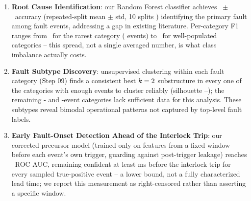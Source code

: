 \begin{enumerate}
    \item \textbf{Root Cause Identification}: our Random Forest classifier achieves \MetricZeroEightPhaseThreeaRootcauseStabilityAccuracyMean\ $\pm$ \MetricZeroEightPhaseThreeaRootcauseStabilityAccuracyStd\ accuracy (repeated-split mean $\pm$ std, 10 splits %
) identifying the primary fault among \MetricZeroEightPhaseThreeaRootcauseNFaultEvents{} fault events, addressing a gap in existing literature. Per-category F1 ranges from \MetricZeroEightPhaseThreeaRootcauseStabilityPerLabelFOneCoupureExterneRapideMean\ for the rarest category (\MetricZeroZeroDataAttritionChainGtPassingCoupureExterneRapide{} events) to \MetricZeroEightPhaseThreeaRootcauseStabilityPerLabelFOneDPSeuilDeSCuritRFMean\ for well-populated categories -- this spread, not a single averaged number, is what class imbalance actually costs.

    \item \textbf{Fault Subtype Discovery}: unsupervised clustering within each fault category (Step 09) %
finds a consistent best $k=2$ substructure in every one of the \MetricZeroNinecEnhancedSubclassDiscoveryNCategoriesAnalyzed{} categories with enough events to cluster reliably (silhouette \MetricZeroNinecEnhancedSubclassDiscoveryCavityQuenchBreakdownSilhouette--\MetricZeroNinecEnhancedSubclassDiscoveryVacuumThresholdSilhouette); the remaining \MetricZeroZeroDataAttritionChainGtPassingSeuilPickUp- and \MetricZeroZeroDataAttritionChainGtPassingCoupureExterneRapide-event categories lack sufficient data for this analysis. These subtypes reveal bimodal operational patterns not captured by top-level fault labels.

    \item \textbf{Early Fault-Onset Detection Ahead of the Interlock Trip}: our corrected precursor model (trained only on features from a fixed window before each event's own trigger, guarding against post-trigger leakage) reaches \MetricZeroFivePhaseZeroPrecursorRandomForestRocAuc\ ROC AUC, remaining confident at least \MetricZeroFivePrecursorLeadTimeLeadTimeMsLowerBoundMeanCensored{}ms before the interlock trip for every sampled true-positive event -- a lower bound, not a fully characterized lead time; we report this measurement as right-censored rather than asserting a specific window.


\end{enumerate}
